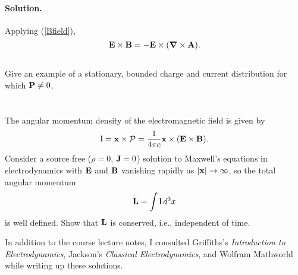 \documentclass[11pt]{article}
\newcommand{\refeq}[1]{(\ref{#1})}
\newcommand{\beq}{\begin{equation*}}
\newcommand{\eeq}{\end{equation*}}
\newcommand{\beqn}{\begin{equation}}
\newcommand{\eeqn}{\end{equation}}
\newenvironment{statement}[1]
{
	\section{#1}
	\color{darkgray}
	\ignorespaces
}
{
}
\newenvironment{problem}
{
	\subsection{}
	\color{darkgray}
    \ignorespaces
}
{

}
\newenvironment{solution}
{
    \paragraph{Solution.}
    \ignorespaces
}
{
    \bigskip
}
\begin{document}
\begin{solution}
	Applying \refeq{Bfield},
	\beq
		\vE \times \vB = -\vE \times (\grad \times \vA).
	\eeq
\end{solution}

\begin{problem}
	Give an example of a stationary, bounded charge and current distribution for which $\vb{P} \neq 0$.
\end{problem}



\newcommand{\vl}{\vb{l}}
\newcommand{\vL}{\vb{L}}

\begin{statement}{}
	The angular momentum density of the electromagnetic field is given by
	\beq
		\vl = \vx \times \vcP
		= \frac{1}{4\pi c} \vx \times (\vE \times \vB).
	\eeq
	Consider a source free ($\rho = 0$, $\vb{J} = 0$) solution to Maxwell's equations in electrodynamics with $\vb{E}$ and $\vb{B}$ vanishing rapidly as $\abs{\vb{x}} \to \infty$, so the total angular momentum
	\beq
		\vL = \int \vl \dcx
	\eeq
	is well defined.  Show that $\vL$ is conserved, i.e., independent of time.
\end{statement}



\vfill
In addition to the course lecture notes, I consulted Griffiths's \emph{Introduction to Electrodynamics}, Jackson's \emph{Classical Electrodynamics}, and Wolfram Mathworld while writing up these solutions.
\end{document}
